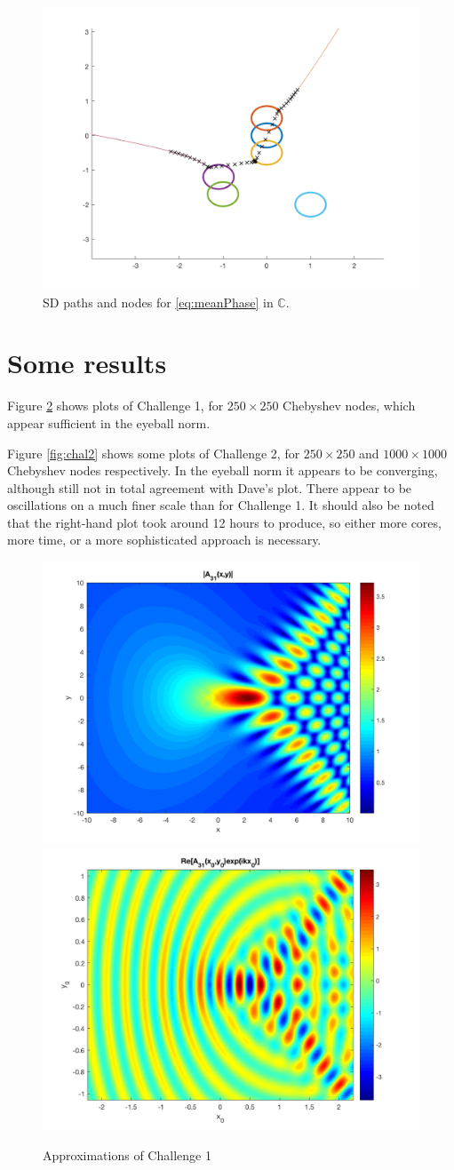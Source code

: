 \documentclass[12pt]{article}
\newcommand{\C}{\mathbb{C}}
\begin{document}
	\begin{figure}
		\centering
		\includegraphics[width=0.7\linewidth]{../images/coalescEG}
		\caption{SD paths and nodes for \eqref{eq:meanPhase} in $\C$.}
		\label{fig:coalesceg}
	\end{figure}
	
	
	\section{Some results}
	
	Figure \ref{fig:chal1} shows plots of Challenge 1, for $250\times250$ Chebyshev nodes, which appear sufficient in the eyeball norm.
	
	Figure \ref{fig:chal2} shows some plots of Challenge 2, for $250\times250$ and $1000\times1000$ Chebyshev nodes respectively. In the eyeball norm it appears to be converging, although still not in total agreement with Dave's plot. There appear to be oscillations on a much finer scale than for Challenge 1. It should also be noted that the right-hand plot took around 12 hours to produce, so either more cores, more time, or a more sophisticated approach is necessary. 
		
		\begin{figure}[h]
		\centering
		\includegraphics[width=0.45\linewidth]{../images/A31}
		\includegraphics[width=0.45\linewidth]{../images/A31k20}
		\caption{Approximations of Challenge 1}
		\label{fig:chal1}
	\end{figure}
	
\end{document}

